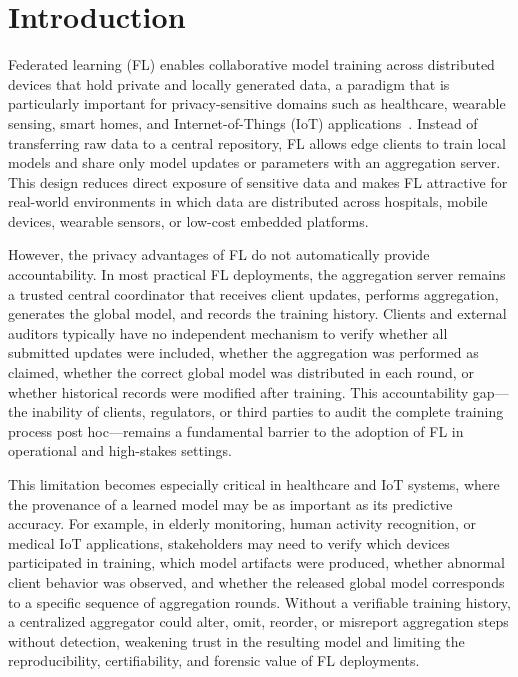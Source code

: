 \documentclass{llncs}
\begin{document}
\begin{abstract}
artifact storage, public auditability, and cost-efficient Layer-2 blockchain verification. All 840 IPFS pins, 620 on-chain transactions, source code, and the full 200-round trace are available at \url{https://github.com/shinratttensei1/FLBL2}.
\end{abstract}


\section{Introduction}

Federated learning (FL) enables collaborative model training across distributed devices that hold private and locally generated data, a paradigm that is particularly important for privacy-sensitive domains such as healthcare, wearable sensing, smart homes, and Internet-of-Things (IoT) applications~\cite{mcmahan2017communication,kairouz2020advances,yazici2023ehealth,singh2022framework}. Instead of transferring raw data to a central repository, FL allows edge clients to train local models and share only model updates or parameters with an aggregation server. This design reduces direct exposure of sensitive data and makes FL attractive for real-world environments in which data are distributed across hospitals, mobile devices, wearable sensors, or low-cost embedded platforms.

However, the privacy advantages of FL do not automatically provide accountability. In most practical FL deployments, the aggregation server remains a trusted central coordinator that receives client updates, performs aggregation, generates the global model, and records the training history. Clients and external auditors typically have no independent mechanism to verify whether all submitted updates were included, whether the aggregation was performed as claimed, whether the correct global model was distributed in each round, or whether historical records were modified after training. This accountability gap---the inability of clients, regulators, or third parties to audit the complete training process post hoc---remains a fundamental barrier to the adoption of FL in operational and high-stakes settings.

This limitation becomes especially critical in healthcare and IoT systems, where the provenance of a learned model may be as important as its predictive accuracy. For example, in elderly monitoring, human activity recognition, or medical IoT applications, stakeholders may need to verify which devices participated in training, which model artifacts were produced, whether abnormal client behavior was observed, and whether the released global model corresponds to a specific sequence of aggregation rounds. Without a verifiable training history, a centralized aggregator could alter, omit, reorder, or misreport aggregation steps without detection, weakening trust in the resulting model and limiting the reproducibility, certifiability, and forensic value of FL deployments.
\end{document}
